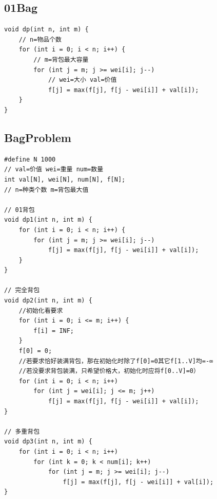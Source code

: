 \documentclass[twoside]{article}
\begin{document}
\subsection{01Bag}
\begin{lstlisting}
void dp(int n, int m) {
    // n=物品个数
    for (int i = 0; i < n; i++) {
        // m=背包最大容量
        for (int j = m; j >= wei[i]; j--)
            // wei=大小 val=价值
            f[j] = max(f[j], f[j - wei[i]] + val[i]);
    }
}
\end{lstlisting}
\subsection{BagProblem}
\begin{lstlisting}
#define N 1000
// val=价值 wei=重量 num=数量
int val[N], wei[N], num[N], f[N];
// n=种类个数 m=背包最大值

// 01背包
void dp1(int n, int m) {
    for (int i = 0; i < n; i++) {
        for (int j = m; j >= wei[i]; j--)
            f[j] = max(f[j], f[j - wei[i]] + val[i]);
    }
}

// 完全背包
void dp2(int n, int m) {
    //初始化看要求
    for (int i = 0; i <= m; i++) {
        f[i] = INF;
    }
    f[0] = 0;
    //若要求恰好装满背包，那在初始化时除了f[0]=0其它f[1..V]均=-∞
    //若没要求背包装满，只希望价格大，初始化时应将f[0..V]=0）
    for (int i = 0; i < n; i++)
        for (int j = wei[i]; j <= m; j++)
            f[j] = max(f[j], f[j - wei[i]] + val[i]);
}

// 多重背包
void dp3(int n, int m) {
    for (int i = 0; i < n; i++)
        for (int k = 0; k < num[i]; k++)
            for (int j = m; j >= wei[i]; j--)
                f[j] = max(f[j], f[j - wei[i]] + val[i]);
}
\end{lstlisting}
\end{document}
